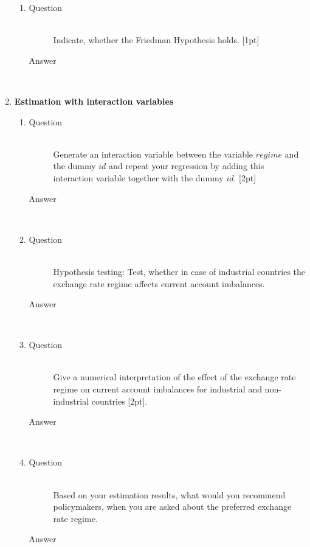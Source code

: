 \documentclass{article}
\begin{document}
\begin{enumerate}
\begin{enumerate}[label=(\alph*)]
    \item 
    \begin{description}
      \item[Question] \hfill \\
      Indicate, whether the Friedman Hypothesis holds. [1pt]
      \item[Answer] \hfill \\
    \end{description}
  \end{enumerate}
  \item \textbf{Estimation with interaction variables}
  \begin{enumerate}[label=(\alph*)]
    \item 
    \begin{description}
      \item[Question] \hfill \\
      Generate an interaction variable between the variable \(regime\) and the dummy \(id\) and repeat your regression by adding this interaction variable together with the dummy \(id\). [2pt]
      \item[Answer] \hfill \\
    \end{description}
    \item 
    \begin{description}
      \item[Question] \hfill \\
      Hypothesis testing: Test, whether in case of industrial countries the exchange rate regime affects current account imbalances.
      \item[Answer] \hfill \\
    \end{description}
    \item 
    \begin{description}
      \item[Question] \hfill \\
      Give a numerical interpretation of the effect of the exchange rate regime on current account imbalances for industrial and non-industrial countries [2pt].
      \item[Answer] \hfill \\
    \end{description}
    \item 
    \begin{description}
      \item[Question] \hfill \\
      Based on your estimation results, what would you recommend policymakers, when you are asked about the preferred exchange rate regime.
      \item[Answer] \hfill \\
    \end{description}
  \end{enumerate}
\end{enumerate}
    
\end{document}
